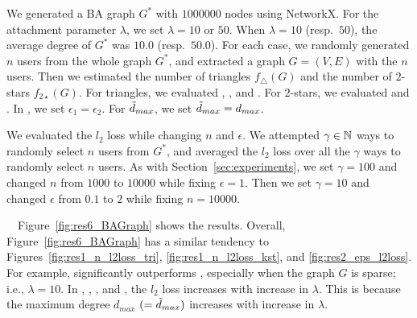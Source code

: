 We generated a BA graph $G^*$ with $1000000$ nodes using NetworkX. 
For the attachment parameter $\lambda$, we set $\lambda=10$ or $50$. 
When $\lambda=10$ (resp.~$50$), the average degree of $G^*$ was $10.0$ (resp.~$50.0$). 
For each case, we randomly generated $n$ users from the whole graph $G^*$, and extracted a graph $G=(V,E)$ with the $n$ users. 
Then we estimated the number of triangles $f_\triangle(G)$ and the number of $2$-stars $f_{2\star}(G)$. 
For triangles, we evaluated , , and . 
For $2$-stars, we evaluated  and . 
In , we set $\epsilon_1 = \epsilon_2$.
For $\tilde{d}_{max}$, we set $\tilde{d}_{max} = d_{max}$. 

We evaluated the $l_2$ loss while changing $n$ and $\epsilon$. 
We attempted $\gamma \in \mathbb{N}$ ways to randomly select $n$ users from $G^*$, and averaged the $l_2$ loss over all the $\gamma$ ways to randomly select $n$ users. 
As with Section~\ref{sec:experiments}, we set $\gamma=100$ and changed $n$ from $1000$ to $10000$ while fixing $\epsilon=1$. 
Then we set $\gamma=10$ and changed $\epsilon$ from $0.1$ to $2$ while fixing $n=10000$.

\smallskip
{}~~Figure~\ref{fig:res6_BAGraph} shows the results. 
Overall, Figure~\ref{fig:res6_BAGraph} has a similar tendency to Figures~\ref{fig:res1_n_l2loss_tri}, \ref{fig:res1_n_l2loss_kst}, and \ref{fig:res2_eps_l2loss}. 
For example,  significantly outperforms , especially when the graph $G$ is sparse; i.e., $\lambda = 10$. 
In , , , and , the $l_2$ loss increases with increase in $\lambda$. 
This is because the maximum degree $d_{max}$ $(= \tilde{d}_{max})$ increases with increase in $\lambda$.

